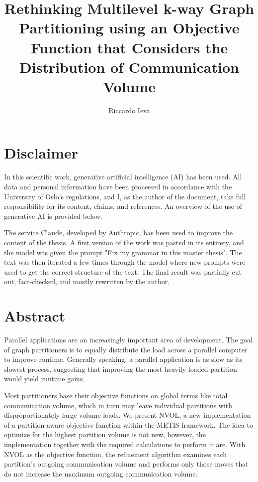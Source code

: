 \documentclass[UKenglish]{uiomasterthesis}
\title{Rethinking Multilevel k-way Graph Partitioning using an Objective Function that Considers the Distribution of Communication Volume}        %
\author{Riccardo Ieva}                      %
\begin{document}
	\uiomasterfp[dept={Department of Informatics},  %
	program={Informatics: Programming and Systems Architecture},                        %
	nosp,
	supervisors={Xing Cai\and James D. Trotter}     %
	]                                     %
	\frontmatter{}
	
	\chapter*{Disclaimer}
	In this scientific work, generative artificial intelligence (AI) has been used. All data and personal information have been processed in accordance with the University of Oslo's regulations, and I, as the author of the document, take full responsibility for its content, claims, and references. An overview of the use of generative AI is provided below.
	
	The service Claude, developed by Anthropic, has been used to improve the content of the thesis. A first version of the work was pasted in its entirety, and the model was given the prompt "Fix my grammar in this master thesis". The text was then iterated a few times through the model where new prompts were used to get the correct structure of the text. The final result was partially cut out, fact-checked, and mostly rewritten by the author.
	
	\chapter*{Abstract}		
	Parallel applications are an increasingly important area of development. The goal of graph partitioners is to equally distribute the load across a parallel computer to improve runtime. Generally speaking, a parallel application is as slow as its slowest process, suggesting that improving the most heavily loaded partition would yield runtime gains.
	
	Most partitioners base their objective functions on global terms like total communication volume, which in turn may leave individual partitions with disproportionately large volume loads. We present NVOL, a new implementation of a partition-aware objective function within the METIS framework. The idea to optimize for the highest partition volume is not new, however, the implementation together with the required calculations to perform it are. With NVOL as the objective function, the refinement algorithm examines each partition's outgoing communication volume and performs only those moves that do not increase the maximum outgoing communication volume.  
	
\end{document}
